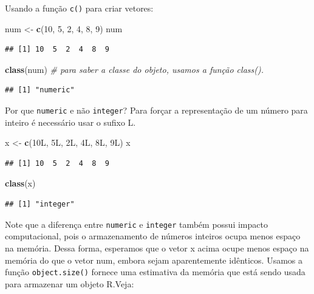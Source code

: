 \documentclass[a4paper]{book}
\newenvironment{Shaded}{\begin{snugshade}}{\end{snugshade}}
\newcommand{\CommentTok}[1]{\textcolor[rgb]{0.56,0.35,0.01}{\textit{#1}}}
\newcommand{\DecValTok}[1]{\textcolor[rgb]{0.00,0.00,0.81}{#1}}
\newcommand{\KeywordTok}[1]{\textcolor[rgb]{0.13,0.29,0.53}{\textbf{#1}}}
\newcommand{\NormalTok}[1]{#1}
\newcommand{\StringTok}[1]{\textcolor[rgb]{0.31,0.60,0.02}{#1}}
\begin{document}
Usando a função \texttt{c()} para criar vetores:

\begin{Shaded}
\begin{Highlighting}[]
\NormalTok{num <-}\StringTok{ }\KeywordTok{c}\NormalTok{(}\DecValTok{10}\NormalTok{, }\DecValTok{5}\NormalTok{, }\DecValTok{2}\NormalTok{, }\DecValTok{4}\NormalTok{, }\DecValTok{8}\NormalTok{, }\DecValTok{9}\NormalTok{)}
\NormalTok{num}
\end{Highlighting}
\end{Shaded}

\begin{verbatim}
## [1] 10  5  2  4  8  9
\end{verbatim}

\begin{Shaded}
\begin{Highlighting}[]
\KeywordTok{class}\NormalTok{(num) }\CommentTok{# para saber a classe do objeto, usamos a função class().}
\end{Highlighting}
\end{Shaded}

\begin{verbatim}
## [1] "numeric"
\end{verbatim}

Por que \texttt{numeric} e não \texttt{integer}? Para forçar a representação de um número para inteiro é necessário usar o sufixo L.

\begin{Shaded}
\begin{Highlighting}[]
\NormalTok{x <-}\StringTok{ }\KeywordTok{c}\NormalTok{(10L, 5L, 2L, 4L, 8L, 9L)}
\NormalTok{x}
\end{Highlighting}
\end{Shaded}

\begin{verbatim}
## [1] 10  5  2  4  8  9
\end{verbatim}

\begin{Shaded}
\begin{Highlighting}[]
\KeywordTok{class}\NormalTok{(x)}
\end{Highlighting}
\end{Shaded}

\begin{verbatim}
## [1] "integer"
\end{verbatim}

Note que a diferença entre \texttt{numeric} e \texttt{integer} também possui impacto computacional, pois o armazenamento de números inteiros ocupa menos espaço na memória. Dessa forma, esperamos que o vetor x acima ocupe menos espaço na memória do que o vetor num, embora sejam aparentemente idênticos. Usamos a função \texttt{object.size()} fornece uma estimativa da memória que está sendo usada para armazenar um objeto R.Veja:
\end{document}

